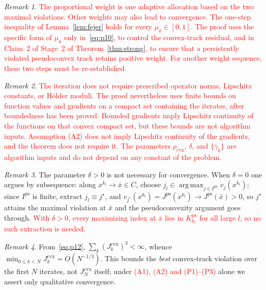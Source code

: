 \documentclass[]{interact}
\theoremstyle{plain}
\theoremstyle{definition}
\theoremstyle{remark}
\newtheorem{remark}{Remark}
\DeclareMathOperator*{\argmax}{arg\,max}
\newcommand{\cvx}{\mathrm{cvx}}
\newcommand{\ps}{\mathrm{ps}}
\begin{document}
\begin{remark}\label{rem:weight-scope}
\leavevmode\textcolor{red}{The proportional weight is one adaptive allocation based on the two maximal violations. Other weights may also lead to convergence. The one-step inequality of Lemma~\ref{lem:fejer} holds for every $\mu_k\in[0,1]$. The proof uses the specific form of $\mu_k$ only in~\eqref{eq:p10}, to control the convex-track residual, and in Claim~2 of Stage~2 of Theorem~\ref{thm:strong}, to ensure that a persistently violated pseudoconvex track retains positive weight. For another weight sequence, these two steps must be re-established.}
\end{remark}

\begin{remark}\label{rem:regularity-scope}
\leavevmode\textcolor{red}{The iteration does not require prescribed operator norms, Lipschitz constants, or H\"older moduli. The proof nevertheless uses finite bounds on function values and gradients on a compact set containing the iterates, after boundedness has been proved. Bounded gradients imply Lipschitz continuity of the functions on that convex compact set, but these bounds are not algorithm inputs. Assumption (A2) does not imply Lipschitz continuity of the gradients, and the theorem does not require it. The parameters $\rho_{\cvx}$, $\delta$, and $\{\gamma_k\}$ are algorithm inputs and do not depend on any constant of the problem.}
\end{remark}

\begin{remark}\label{rem:delta-role}
The parameter $\delta>0$ is not necessary for convergence. When $\delta=0$ one argues by subsequence: along $x^{k_l}\to\bar x\in C$, choose $j_l\in\argmax_{j\in I^{\ps}}v_j(x^{k_l})$; since $I^{\ps}$ is finite, extract $j_l\equiv j^\star$, and $v_{j^\star}(x^{k_l})=J^{\ps}(x^{k_l})\to J^{\ps}(\bar x)>0$, so $j^\star$ attains the maximal violation at $\bar x$ and the pseudoconvexity argument goes through. \leavevmode\textcolor{red}{With $\delta>0$, every maximizing index at $\bar x$ lies in $K^{\ps}_{k_l}$ for all large $l$, so no such extraction is needed.}
\end{remark}

\begin{remark}\label{rem:rate}
From~\eqref{eq:p12}, $\sum_k(J^{\cvx}_k)^3<\infty$, whence $\min_{0\le k<N}J^{\cvx}_k=O(N^{-1/3})$. This bounds the \emph{best} convex-track violation over the first $N$ iterates, not $J^{\cvx}_N$ itself; under \leavevmode\textcolor{red}{(A1), (A2) and (P1)--(P3)} alone we assert only qualitative convergence.
\end{remark}
\end{document}
